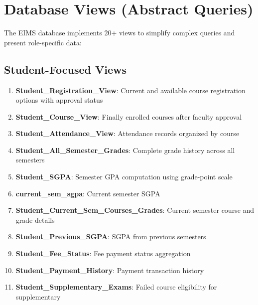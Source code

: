 \documentclass[12pt]{article}
\begin{document}
\newpage

\section{Database Views (Abstract Queries)}

The EIMS database implements 20+ views to simplify complex queries and present role-specific data:

\subsection{Student-Focused Views}

\begin{enumerate}
    \item \textbf{Student\_Registration\_View}: Current and available course registration options with approval status
    
    \item \textbf{Student\_Course\_View}: Finally enrolled courses after faculty approval
    
    \item \textbf{Student\_Attendance\_View}: Attendance records organized by course
    
    \item \textbf{Student\_All\_Semester\_Grades}: Complete grade history across all semesters
    
    \item \textbf{Student\_SGPA}: Semester GPA computation using grade-point scale
    
    \item \textbf{current\_sem\_sgpa}: Current semester SGPA
    
    \item \textbf{Student\_Current\_Sem\_Courses\_Grades}: Current semester course and grade details
    
    \item \textbf{Student\_Previous\_SGPA}: SGPA from previous semesters
    
    \item \textbf{Student\_Fee\_Status}: Fee payment status aggregation
    
    \item \textbf{Student\_Payment\_History}: Payment transaction history
    
    \item \textbf{Student\_Supplementary\_Exams}: Failed course eligibility for supplementary
    

\end{enumerate}
\end{document}
